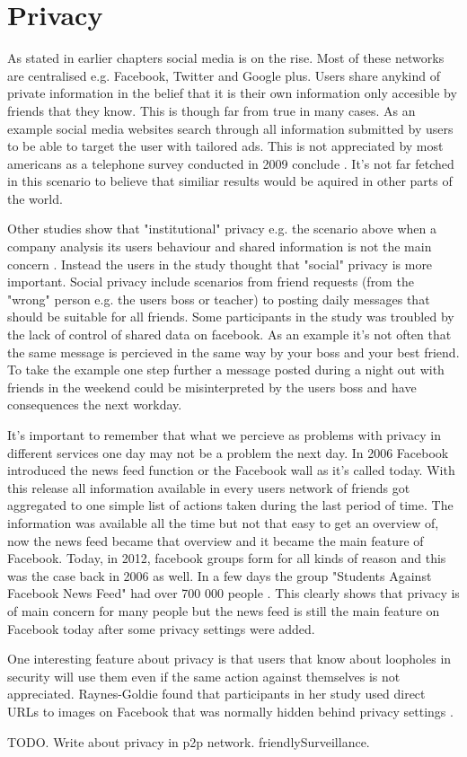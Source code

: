 \section{Privacy}
As stated in earlier chapters social media is on the rise.
Most of these networks are centralised e.g. Facebook, Twitter and Google plus.
Users share anykind of private information in the belief that it is their own information only accesible by friends that they know.
This is though far from true in many cases.
As an example social media websites search through all information submitted by users to be able to target the user with tailored ads.
This is not appreciated by most americans as a telephone survey conducted in 2009 conclude \cite{turow2009}.
It's not far fetched in this scenario to believe that similiar results would be aquired in other parts of the world.

Other studies show that "institutional" privacy e.g. the scenario above when a company analysis its users behaviour and shared information is not the main concern \cite{raynes-goldie2010}.
Instead the users in the study thought that "social" privacy is more important.
Social privacy include scenarios from friend requests (from the "wrong" person e.g. the users boss or teacher) to posting daily messages that should be suitable for all friends.
Some participants in the study was troubled by the lack of control of shared data on facebook.
As an example it's not often that the same message is percieved in the same way by your boss and your best friend.
To take the example one step further a message posted during a night out with friends in the weekend could be misinterpreted by the users boss and have consequences the next workday.

It's important to remember that what we percieve as problems with privacy in different services one day may not be a problem the next day.
In 2006 Facebook introduced the news feed function or the Facebook wall as it's called today.
With this release all information available in every users network of friends got aggregated to one simple list of actions taken during the last period of time.
The information was available all the time but not that easy to get an overview of, now the news feed became that overview and it became the main feature of Facebook.
Today, in 2012, facebook groups form for all kinds of reason and this was the case back in 2006 as well.
In a few days the group "Students Against Facebook News Feed" had over 700 000 people \cite{boyd2008}.
This clearly shows that privacy is of main concern for many people but the news feed is still the main feature on Facebook today after some privacy settings were added.

One interesting feature about privacy is that users that know about loopholes in security will use them even if the same action against themselves is not appreciated.
Raynes-Goldie found that participants in her study used direct URLs to images on Facebook that was normally hidden behind privacy settings \cite{raynes-goldie2010}.

TODO. Write about privacy in p2p network. friendlySurveillance.

